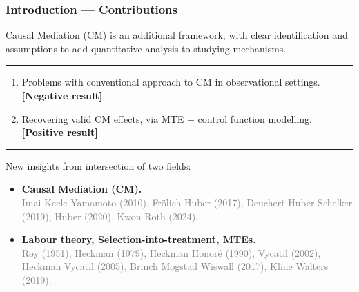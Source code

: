 \documentclass[dvipsnames]{beamer} %
\begin{document}
\begin{frame}
    \frametitle{Introduction ---  Contributions}
    Causal Mediation (CM) is an additional framework, with clear identification and assumptions to add quantitative analysis to studying mechanisms.

    \par\noindent\rule{\textwidth}{0.4pt}
    \begin{enumerate}
        \item Problems with conventional approach to CM in observational settings.
        \\ \textbf{[Negative result]}
        \item Recovering valid CM effects, via MTE $+$ control function modelling.
        \\ \textbf{[Positive result]}
    \end{enumerate}

    \par\noindent\rule{\textwidth}{0.4pt}
    New insights from intersection of two fields:
    \begin{itemize}
        \item \textbf{Causal Mediation (CM).}
        \\ \textcolor{gray}{\footnotesize Imai Keele Yamamoto (2010), Fr\"olich Huber (2017), Deuchert Huber Schelker (2019), Huber (2020), Kwon Roth (2024).}
        \item \textbf{Labour theory, Selection-into-treatment, MTEs.}
        \\ \textcolor{gray}{\footnotesize Roy (1951), Heckman (1979), Heckman Honor\'e (1990), Vycatil (2002), Heckman Vycatil (2005), Brinch Mogstad Wiswall (2017), Kline Walters (2019).}
    \end{itemize}
\end{frame}
\end{document}
